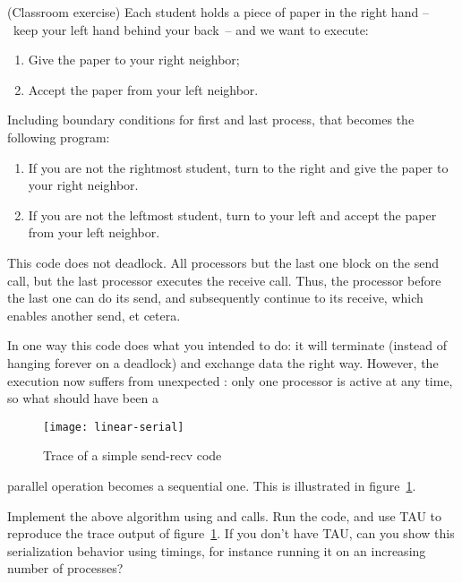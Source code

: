 \begin{exercise}
  \label{ex:serialsend}
  (Classroom exercise) Each student holds a piece of paper
  in the right hand --~keep your left hand behind your back~--
  and we want to execute:
  \begin{enumerate}
  \item Give the paper to your right neighbor;
  \item Accept the paper from your left neighbor.
  \end{enumerate}
  Including boundary conditions for first and last process, that becomes
  the following program:
  \begin{enumerate}
  \item If you are not the rightmost student, turn to the right
    and give the paper to your right neighbor.
  \item If you are not the leftmost student, turn to your left and
    accept the paper from your left neighbor.
  \end{enumerate}
\end{exercise}

This code does not deadlock. All processors but the last one block on
the send call, but the last processor executes the receive call. Thus,
the processor before the last one can do its send, and subsequently
continue to its receive, which enables another send, et cetera.

In one way this code does what you intended to do:
it will terminate (instead of hanging forever on a
deadlock) and exchange data the right way. However, the execution
now suffers from unexpected : only
one processor is active at any time, so what should have been a
%
\begin{figure}[ht]
\texttt{[image: linear-serial]}
\caption{Trace of a simple send-recv code}
\label{fig:serialization}
\end{figure}
%
parallel operation becomes a sequential one. This is illustrated in
figure~\ref{fig:serialization}.

\begin{exercise}
  \label{ex:linear-sequential}
  Implement the above algorithm using  and  calls.
  Run the code, and use TAU to reproduce the trace output 
  of figure~\ref{fig:serialization}.
  If you don't have TAU, can you show this serialization
  behavior using timings, for instance running it on an increasing number of processes?
\end{exercise}

